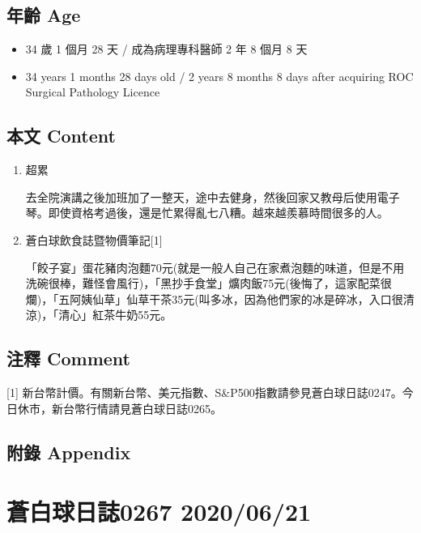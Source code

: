 \documentclass[a5paper, 11pt
]{book}
\providecommand{\tightlist}{%
  \setlength{\itemsep}{0pt}\setlength{\parskip}{0pt}}
\begin{document}
\hypertarget{ux5e74ux9f61-age-19}{%
\subsection{年齡 Age}\label{ux5e74ux9f61-age-19}}

\begin{itemize}
\tightlist
\item
  34 歲 1 個月 28 天 / 成為病理專科醫師 2 年 8 個月 8 天
\item
  34 years 1 months 28 days old / 2 years 8 months 8 days after
  acquiring ROC Surgical Pathology Licence
\end{itemize}

\hypertarget{ux672cux6587-content-19}{%
\subsection{本文 Content}\label{ux672cux6587-content-19}}

\begin{enumerate}
\def\labelenumi{\arabic{enumi}.}
\item
  超累

  去全院演講之後加班加了一整天，途中去健身，然後回家又教母后使用電子琴。即使資格考過後，還是忙累得亂七八糟。越來越羨慕時間很多的人。
\item
  蒼白球飲食誌暨物價筆記{[}1{]}

  「餃子宴」蛋花豬肉泡麵70元(就是一般人自己在家煮泡麵的味道，但是不用洗碗很棒，難怪會風行)，「黑抄手食堂」爌肉飯75元(後悔了，這家配菜很爛)，「五阿姨仙草」仙草干茶35元(叫多冰，因為他們家的冰是碎冰，入口很清涼)，「清心」紅茶牛奶55元。
\end{enumerate}

\hypertarget{ux6ce8ux91cb-comment-19}{%
\subsection{注釋 Comment}\label{ux6ce8ux91cb-comment-19}}

{[}1{]}
新台幣計價。有關新台幣、美元指數、S\&P500指數請參見蒼白球日誌0247。今日休市，新台幣行情請見蒼白球日誌0265。

\hypertarget{ux9644ux9304-appendix-19}{%
\subsection{附錄 Appendix}\label{ux9644ux9304-appendix-19}}

\hypertarget{ux84bcux767dux7403ux65e5ux8a8c0267-20200621}{%
\section{蒼白球日誌0267
2020/06/21}\label{ux84bcux767dux7403ux65e5ux8a8c0267-20200621}}
\end{document}
